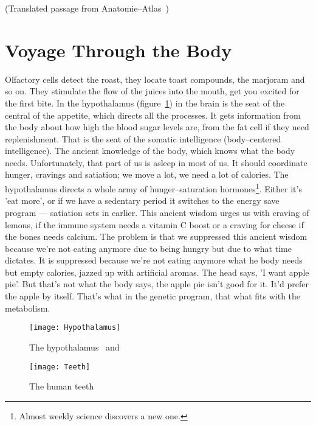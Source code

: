 \documentclass[../main.tex]{subfiles}
\begin{document}
(Translated passage from Anatomie--Atlas~\cite{AAtlas})
\section{Voyage Through the Body}

Olfactory cells detect the roast, they locate toast compounds, the marjoram and so on.
They stimulate the flow of the juices into the mouth, get you excited for the first bite.
In the hypothalamus (figure~\ref{hypothalamus}) in the brain is the seat of the central of the appetite, which directs all the processes.
It gets information from the body about how high the blood sugar levels are, from the fat cell if they need replenishment.
That is the seat of the somatic intelligence (body--centered intelligence).
The ancient knowledge of the body, which knows what the body needs.
Unfortunately, that part of us is asleep in most of us.
It should coordinate hunger, cravings and satiation; we move a lot, we need a lot of calories.
The hypothalamus directs a whole army of hunger--saturation hormones\footnote{Almost weekly science discovers a new one.}.
Either it's 'eat more', or if we have a sedentary period it switches to the energy save program --- satiation sets in earlier.
This ancient wisdom urges us with craving of lemons, if the immune system needs a vitamin C boost or a craving for cheese if the bones needs calcium.
The problem is that we suppressed this ancient wisdom because we're not eating anymore due to being hungry but due to what time dictates.
It is suppressed because we're not eating anymore what he body needs but empty calories, jazzed up with artificial aromas.
The head says, 'I want apple pie'. But that's not what the body says, the apple pie isn't good for it. It'd prefer the apple by itself.
That's what in the genetic program, that what fits with the metabolism.

\begin{figure}[h]
\texttt{[image: Hypothalamus]}
  \caption{The hypothalamus~\cite{hypothalamus} and~\cite{hypothalamus-detail}}\label{hypothalamus}
\end{figure}



\begin{figure}[htb!]
  \texttt{[image: Teeth]}
  \caption{The human teeth~\cite{SciAnim}}\label{teeth}
\end{figure}
\end{document}
